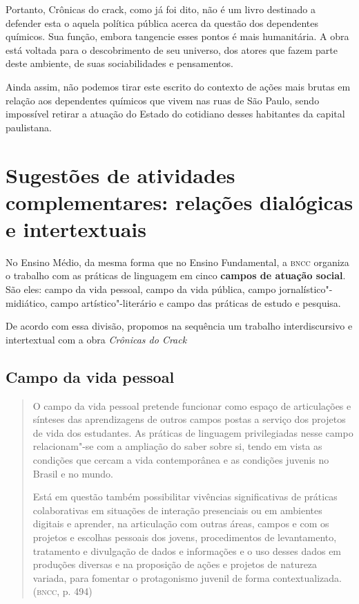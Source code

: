 \documentclass[11pt]{extarticle}
\begin{document}
Portanto, Crônicas do crack, como já foi dito, não é um livro destinado
a defender esta o aquela política pública acerca da questão dos
dependentes químicos. Sua função, embora tangencie esses pontos é mais
humanitária. A obra está voltada para o descobrimento de seu universo,
dos atores que fazem parte deste ambiente, de suas sociabilidades e
pensamentos.

Ainda assim, não podemos tirar este escrito do contexto de ações mais
brutas em relação aos dependentes químicos que vivem nas ruas de São
Paulo, sendo impossível retirar a atuação do Estado do cotidiano desses
habitantes da capital paulistana.


\section{Sugestões de atividades complementares: relações dialógicas e
intertextuais}


No Ensino Médio, da mesma forma que no Ensino Fundamental, a \textsc{bncc}
organiza o trabalho com as práticas de linguagem em cinco \textbf{campos
de atuação social}. São eles: campo da vida pessoal, campo da vida
pública, campo jornalístico"-midiático, campo artístico"-literário e campo
das práticas de estudo e pesquisa.

De acordo com essa divisão, propomos na sequência um trabalho
interdiscursivo e intertextual com a obra \emph{Crônicas do Crack}

\subsection{Campo da vida pessoal}

\begin{quote}
O campo da vida pessoal pretende funcionar como espaço de articulações
e sínteses das aprendizagens de outros campos postas a serviço dos
projetos de vida dos estudantes. As práticas de linguagem privilegiadas
nesse campo relacionam"-se com a ampliação do saber sobre si, tendo em
vista as condições que cercam a vida contemporânea e as condições
juvenis no Brasil e no mundo.

Está em questão também possibilitar vivências significativas de práticas
colaborativas em situações de interação presenciais ou em ambientes
digitais e aprender, na articulação com outras áreas, campos e com os
projetos e escolhas pessoais dos jovens, procedimentos de levantamento,
tratamento e divulgação de dados e informações e o uso desses dados em
produções diversas e na proposição de ações e projetos de natureza
variada, para fomentar o protagonismo juvenil de forma
contextualizada. (\textsc{bncc}, p. 494)
\end{quote}
\end{document}
